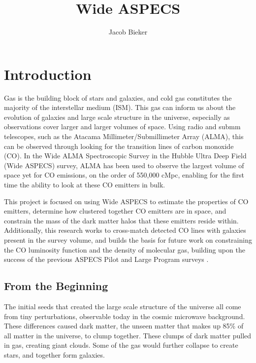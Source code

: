 \documentclass[twoside,single]{lion-msc}
\title{Wide ASPECS}
\author{Jacob Bieker}
\affiliation{Leiden Observatory, Leiden University}
\begin{document}
\maketitle

\tableofcontents
\cleardoublepage

\chapter{Introduction}

Gas is the building block of stars and galaxies, and cold gas constitutes the majority of the interstellar medium (ISM). This gas can inform us about the evolution of galaxies and large scale structure in the universe, especially as observations cover larger and larger volumes of space. Using radio and submm telescopes, such as the Atacama Millimeter/Submillimeter Array (ALMA), this can be observed through looking for the transition lines of carbon monoxide (CO). In the Wide ALMA Spectroscopic Survey in the Hubble Ultra Deep Field (Wide ASPECS) survey, ALMA has been used to observe the largest volume of space yet for CO emissions, on the order of 550,000 cMpc, enabling for the first time the ability to look at these CO emitters in bulk.

This project is focused on using Wide ASPECS to estimate the properties of CO emitters, determine how clustered together CO emitters are in space, and constrain the mass of the dark matter halos that these emitters reside within. Additionally, this research works to cross-match detected CO lines with galaxies present in the survey volume, and builds the basis for future work on constraining the CO luminosity function and the density of molecular gas, building upon the success of the previous ASPECS Pilot and Large Program surveys \cite{walter2016alma, decarli2019alma}. 

\section{From the Beginning}

The initial seeds that created the large scale structure of the universe all come from tiny perturbations, observable today in the cosmic microwave background. These differences caused dark matter, the unseen matter that makes up 85\% of all matter in the universe, to clump together. These clumps of dark matter pulled in gas, creating giant clouds. Some of the gas would further collapse to create stars, and together form galaxies.
\end{document}
